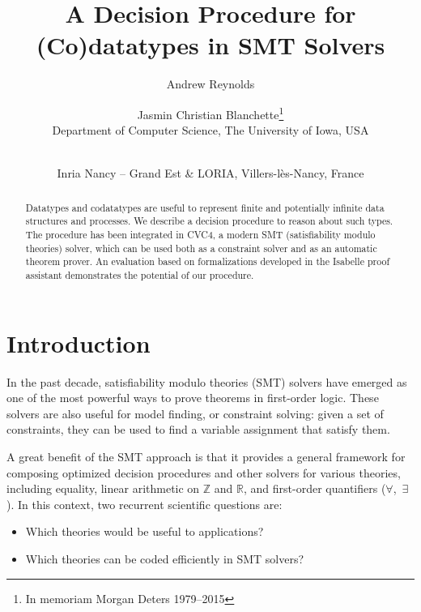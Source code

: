 \documentclass[letter]{article}
\theoremstyle{definition}
\begin{document}
\title{A Decision Procedure for (Co)datatypes in SMT Solvers}

\author {Andrew Reynolds \and Jasmin Christian Blanchette\thanks{In memoriam Morgan Deters 1979--2015} \\
Department of Computer Science, The University of Iowa, USA \and \\
Inria Nancy -- Grand Est \& LORIA, Villers-l\`es-Nancy, France
}



\maketitle

\begin{abstract}
Datatypes and codatatypes are useful to represent finite and potentially
infinite data structures and processes. We describe a decision procedure
to reason about such types. The procedure has been
integrated in CVC4, a modern SMT (satisfiability modulo theories)
solver, which can be used both as a constraint solver and as an
automatic theorem prover. An evaluation based on formalizations developed
in the Isabelle proof assistant demonstrates the potential of our
procedure.
\end{abstract}

\section{Introduction}
\label{sec:introduction}

In the past decade, satisfiability modulo theories (SMT) solvers
\cite{nieuwenhuis-et-al-2006}
have emerged as one of the most powerful ways to
prove theorems in first-order logic. These solvers are also useful for model
finding, or constraint solving: given a set of constraints, they can be used
to find a variable assignment that satisfy them.

A great benefit of the SMT approach is that it provides a general framework
for composing optimized decision procedures and other solvers for various
theories, including equality, linear arithmetic on $\mathbb{Z}$ and
$\mathbb{R}$, and first-order quantifiers ($\forall$,~$\exists$). In this
context, two recurrent scientific questions are:
\begin{itemize}
\item Which theories would be useful to applications?
\item Which theories can be coded efficiently in SMT solvers?
\end{itemize}
\end{document}
